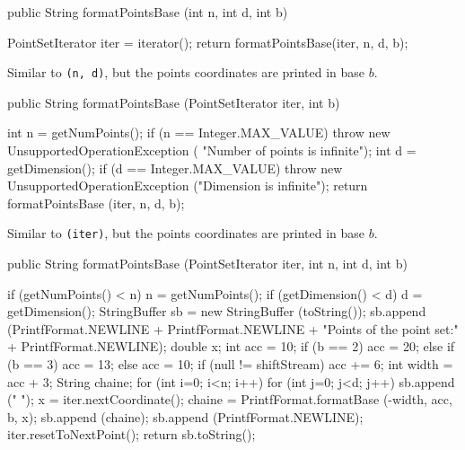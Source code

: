 \begin{code}

   public String formatPointsBase (int n, int d, int b) \begin{hide} {
      PointSetIterator iter = iterator();
      return formatPointsBase(iter, n, d, b);
   }\end{hide}
\end{code}
\begin{tabb}
Similar to \texttt{(n, d)}, but the
 points coordinates are printed in base $b$.
\end{tabb}
\begin{htmlonly}
\end{htmlonly}
\begin{code}

   public String formatPointsBase (PointSetIterator iter, int b) \begin{hide} {
      int n = getNumPoints();
      if (n == Integer.MAX_VALUE)
         throw new UnsupportedOperationException (
            "Number of points is infinite");
      int d = getDimension();
      if (d == Integer.MAX_VALUE)
         throw new UnsupportedOperationException ("Dimension is infinite");
      return formatPointsBase (iter, n, d, b);
   }\end{hide}
\end{code}
\begin{tabb}
Similar to
\texttt{(iter)},
but the points coordinates are printed in base $b$.
\end{tabb}
\begin{htmlonly}
\end{htmlonly}
\begin{code}

   public String formatPointsBase (PointSetIterator iter, int n, int d, int b) \begin{hide} {
      if (getNumPoints() < n)
         n = getNumPoints();
      if (getDimension() < d)
         d = getDimension();
      StringBuffer sb = new StringBuffer (toString());
      sb.append (PrintfFormat.NEWLINE + PrintfFormat.NEWLINE
                 + "Points of the point set:" + PrintfFormat.NEWLINE);
      double x;
      int acc = 10;
      if (b == 2)
         acc = 20;
      else if (b == 3)
         acc = 13;
      else
         acc = 10;
      if (null != shiftStream)
         acc += 6;
      int width = acc + 3;
      String chaine;
      for (int i=0; i<n; i++) {
        for (int j=0; j<d; j++) {
            sb.append ("  ");
            x = iter.nextCoordinate();
            chaine = PrintfFormat.formatBase (-width, acc, b, x);
            sb.append (chaine);
         }
         sb.append (PrintfFormat.NEWLINE);
         iter.resetToNextPoint();
      }
      return sb.toString();
   }\end{hide}
\end{code}
